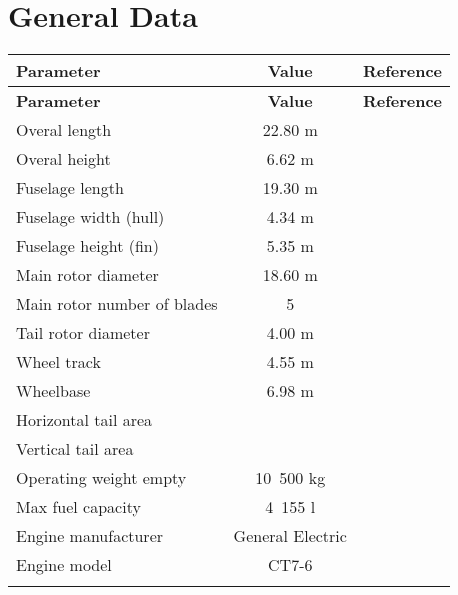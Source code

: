 \section{General Data}

\begin{tabularx}{\textwidth}{ | L | c | c | }
  \hline
  \textbf{Parameter}                    & \textbf{Value}   & \textbf{Reference} \\ \hline
  \endfirsthead
  \hline
  \textbf{Parameter}                    & \textbf{Value}   & \textbf{Reference} \\ \hline
  \endhead
  Overal length                         & 22.80 m          & \cite{Janes20042005} \\ \hline
  Overal height                         & 6.62 m           & \cite{Janes20042005} \\ \hline
  Fuselage length                       & 19.30 m          & \cite{EASA-R-013} \\ \hline
  Fuselage width (hull)                 & 4.34 m           & \cite{EASA-R-013} \\ \hline
  Fuselage height (fin)                 & 5.35 m           & \cite{EASA-R-013} \\ \hline
  Main rotor diameter                   & 18.60 m          & \cite{EASA-R-013} \\ \hline
  Main rotor number of blades           & 5                & \cite{Janes20042005} \\ \hline
  Tail rotor diameter                   & 4.00 m           & \cite{EASA-R-013} \\ \hline
  Wheel track                           & 4.55 m           & \cite{Janes20042005} \\ \hline
  Wheelbase                             & 6.98 m           & \cite{Janes20042005} \\ \hline
  Horizontal tail area                  &  &  \\ \hline
  Vertical tail area                    &  &  \\ \hline
  Operating weight empty                & 10~500 kg        & \cite{Janes20042005} \\ \hline
  Max fuel capacity                     & 4~155 l          & \cite{EASA-R-013} \\ \hline
  Engine manufacturer                   & General Electric & \cite{EASA-R-013} \\ \hline
  Engine model                          & CT7-6            & \cite{EASA-R-013} \\ \hline
  \caption{General Data}
\end{tabularx}
